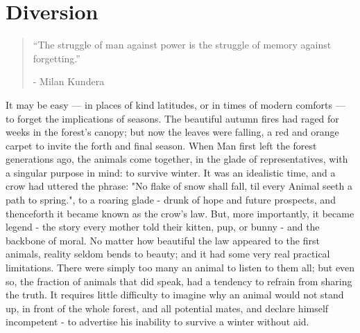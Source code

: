 \chapter{Diversion}

\vspace{-1.3cm}
\begin{localsize}{10}
	\begin{quote}
		“The struggle of man against power is the struggle of memory against forgetting.”
		\begin{flushright}- Milan Kundera \end{flushright}
	\end{quote} 
\end{localsize}
\vspace{1cm}


It may be easy — in places of kind latitudes, or in times of modern comforts — to forget the implications of seasons. The beautiful autumn fires had raged for weeks in the forest's canopy; but now the leaves were falling, a red and orange carpet to invite the forth and final season. 
When Man first left the forest generations ago, the animals come together, in the glade of representatives, with a singular purpose in mind: to survive winter. It was an idealistic time, and a crow had uttered the phrase: "No flake of snow shall fall, til every Animal seeth a path to spring.", to a roaring glade - drunk of hope and future prospects, and thenceforth it became known as the crow's law. But, more importantly, it became legend - the story every mother told their kitten, pup, or bunny - and the backbone of moral.
No matter how beautiful the law appeared to the first animals, reality seldom bends to beauty; and it had some very real practical limitations.
There were simply too many an animal to listen to them all; but even so, the fraction of animals that did speak, had a tendency to refrain from sharing the truth. It requires little difficulty to imagine why an animal would not stand up, in front of the whole forest, and all potential mates, and declare himself incompetent - to advertise his inability to survive a winter without aid. 


 
